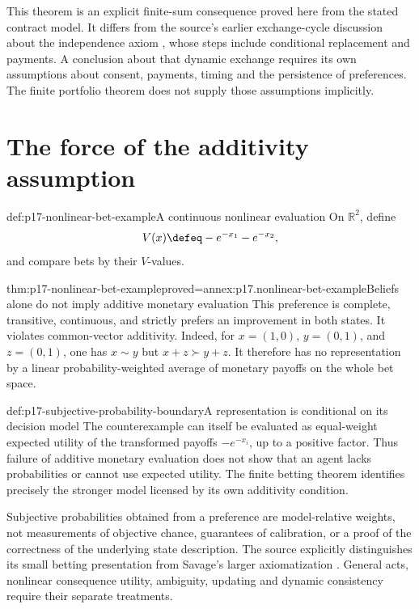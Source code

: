 This theorem is an explicit finite-sum consequence proved here from
the stated contract model. It differs from the source's earlier
exchange-cycle discussion about the independence axiom
\cite[pp.~100--101]{Rubinstein2015LectureNotes}, whose steps include
conditional replacement and payments. A conclusion about that dynamic
exchange requires its own assumptions about consent, payments, timing
and the persistence of preferences. The finite portfolio theorem
does not supply those assumptions implicitly.

\section{The force of the additivity assumption}
\label{sec:p17-bet-additivity-boundary}

\begin{hbdefinition}{def:p17-nonlinear-bet-example}{A continuous nonlinear evaluation}
On \(\mathbb R^2\), define
\[
                         V(x)\defeq-e^{-x_1}-e^{-x_2},
\]
and compare bets by their \(V\)-values.
\end{hbdefinition}

\begin{hbtheorem}{thm:p17-nonlinear-bet-example}{proved=annex:p17.nonlinear-bet-example}{Beliefs alone do not imply additive monetary evaluation}
This preference is complete, transitive, continuous, and strictly
prefers an improvement in both states. It violates common-vector
additivity. Indeed, for \(x=(1,0)\), \(y=(0,1)\), and \(z=(0,1)\),
one has \(x\sim y\) but \(x+z\succ y+z\).
It therefore has no representation by a linear probability-weighted
average of monetary payoffs on the whole bet space.
\end{hbtheorem}

\begin{hbwarning}{def:p17-subjective-probability-boundary}{A representation is conditional on its decision model}
The counterexample can itself be evaluated as equal-weight expected
utility of the transformed payoffs \(-e^{-x_i}\), up to a positive
factor. Thus failure of additive monetary evaluation does not show
that an agent lacks probabilities or cannot use expected utility.
The finite betting theorem identifies precisely the stronger model
licensed by its own additivity condition.

Subjective probabilities obtained from a preference are model-relative
weights, not measurements of objective chance, guarantees of calibration,
or a proof of the correctness of the underlying state description.
The source explicitly distinguishes its small betting presentation
from Savage's larger axiomatization
\cite[p.~102]{Rubinstein2015LectureNotes}. General acts, nonlinear
consequence utility, ambiguity, updating and dynamic consistency
require their separate treatments.
\end{hbwarning}
